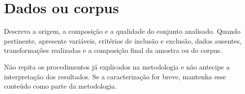 
\chapter{Dados ou corpus}

Descreva a origem, a composição e a qualidade do conjunto analisado. Quando pertinente, apresente variáveis, critérios de inclusão e exclusão, dados ausentes, transformações realizadas e a composição final da amostra ou do corpus.

Não repita os procedimentos já explicados na metodologia e não antecipe a interpretação dos resultados. Se a caracterização for breve, mantenha esse conteúdo como parte da metodologia.
